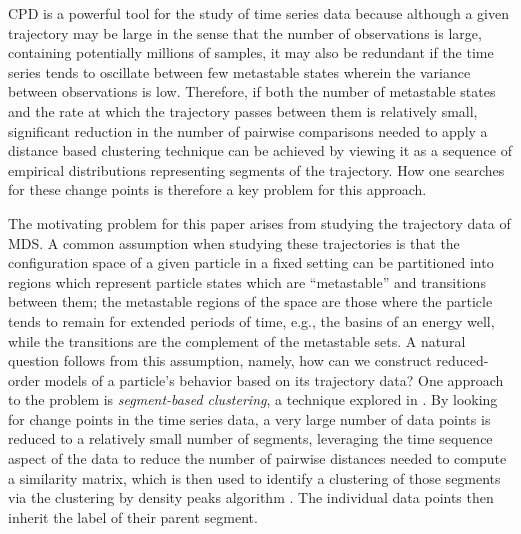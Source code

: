 \documentclass{article}
\newif\ifshowcomments
\newcommand{\DCGedit}[2]{%
  \ifshowcomments
    \textcolor{gray}{\sout{#1}}%
    \textcolor{magenta}{[#2]}%
  \fi
}
\begin{document}
CPD is a powerful tool for the study of time series data because although a given trajectory may be large in the sense that the number of observations is large, containing potentially millions of samples, it may also be redundant if the time series tends to oscillate between few metastable states wherein the variance between observations is low. Therefore, if both the number of metastable states and the rate at which the trajectory passes between them is relatively small, significant reduction in the number of pairwise comparisons needed to apply a distance based clustering technique can be achieved by viewing it as a sequence of empirical distributions representing segments of the trajectory. How one searches for these change points is therefore a key problem for this approach. %

The motivating problem for this paper arises from studying the trajectory data of MDS. A common assumption when studying these trajectories is that the configuration space of a given particle in a fixed setting can be partitioned into regions which represent particle states which are ``metastable'' and transitions between them; the metastable regions of the space are those where the particle tends to remain for extended periods of time, e.g., the basins of an energy well, while the transitions are the complement of the metastable sets. A natural question follows from this assumption, namely, how can we construct reduced-order models of a particle's behavior based on its trajectory data? One approach to the problem is \textit{segment-based clustering}, a technique explored in \cite{damjanovicCATBOSSClusterAnalysis2021}. By looking for change points in the time series data, a very large number of data points is reduced to a relatively small number of segments, leveraging the time sequence aspect of the data to reduce the number of pairwise distances needed to compute a similarity matrix, which is then used to identify a clustering of those segments via the clustering by density peaks algorithm \cite{rodriguezClusteringFastSearch2014, wangDensityPeakClustering2024}. The individual data points then inherit the label of their parent segment.
\end{document}
